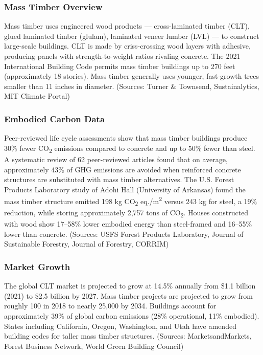 \documentclass[11pt,letterpaper]{article}
\begin{document}
\subsubsection{Mass Timber Overview}

Mass timber uses engineered wood products --- cross-laminated timber (CLT), glued laminated timber (glulam), laminated veneer lumber (LVL) --- to construct large-scale buildings. CLT is made by criss-crossing wood layers with adhesive, producing panels with strength-to-weight ratios rivaling concrete. The 2021 International Building Code permits mass timber buildings up to 270 feet (approximately 18 stories). Mass timber generally uses younger, fast-growth trees smaller than 11 inches in diameter. (Sources: Turner \& Townsend, Sustainalytics, MIT Climate Portal)

\subsubsection{Embodied Carbon Data}

Peer-reviewed life cycle assessments show that mass timber buildings produce 30\% fewer CO\textsubscript{2} emissions compared to concrete and up to 50\% fewer than steel. A systematic review of 62 peer-reviewed articles found that on average, approximately 43\% of GHG emissions are avoided when reinforced concrete structures are substituted with mass timber alternatives. The U.S. Forest Products Laboratory study of Adohi Hall (University of Arkansas) found the mass timber structure emitted 198 kg CO\textsubscript{2} eq./m\textsuperscript{2} versus 243 kg for steel, a 19\% reduction, while storing approximately 2,757 tons of CO\textsubscript{2}. Houses constructed with wood show 17--58\% lower embodied energy than steel-framed and 16--55\% lower than concrete. (Sources: USFS Forest Products Laboratory, Journal of Sustainable Forestry, Journal of Forestry, CORRIM)

\subsubsection{Market Growth}

The global CLT market is projected to grow at 14.5\% annually from \$1.1 billion (2021) to \$2.5 billion by 2027. Mass timber projects are projected to grow from roughly 100 in 2018 to nearly 25,000 by 2034. Buildings account for approximately 39\% of global carbon emissions (28\% operational, 11\% embodied). States including California, Oregon, Washington, and Utah have amended building codes for taller mass timber structures. (Sources: MarketsandMarkets, Forest Business Network, World Green Building Council)
\end{document}
